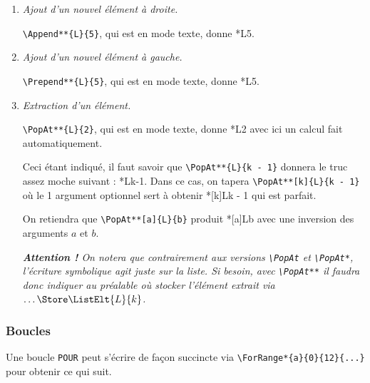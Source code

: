 \begin{enumerate}
	\item \textit{Ajout d'un nouvel élément à droite.}

	      \verb+\Append**{L}{5}+, qui est en mode texte, donne \Append**{L}{5}.


	\item \textit{Ajout d'un nouvel élément à gauche.}

	      \verb+\Prepend**{L}{5}+, qui est en mode texte, donne \Prepend**{L}{5}.


	\item \textit{Extraction d'un élément.}

	      \verb+\PopAt**{L}{2}+, qui est en mode texte, donne \PopAt**{L}{2} avec ici un calcul fait automatiquement.

	      Ceci étant indiqué, il faut savoir que \verb+\PopAt**{L}{k - 1}+ donnera le truc assez moche suivant : \PopAt**{L}{k-1}.
	      Dans ce cas, on tapera \verb+\PopAt**[k]{L}{k - 1}+ où le 1\ier{} argument optionnel sert à obtenir \PopAt**[k]{L}{k - 1} qui est parfait.

	      On retiendra que \verb+\PopAt**[a]{L}{b}+ produit \PopAt**[a]{L}{b} avec une inversion des arguments $a$ et $b$.

	      \smallskip

	      \emph{\textbf{Attention !} On notera que contrairement aux versions \emph{\texttt{\textbackslash{}PopAt}} et \emph{\texttt{\textbackslash{}PopAt*}}, l'écriture symbolique agit juste sur la liste. Si besoin, avec \emph{\texttt{\textbackslash{}PopAt**}} il faudra donc indiquer au préalable où stocker l'élément extrait via $\dots \Store \ListElt{L}{k}$.}
\end{enumerate}




\subsubsection{Boucles}

Une boucle \verb+POUR+ peut s'écrire de façon succincte via \verb+\ForRange*{a}{0}{12}{...}+ pour obtenir ce qui suit.

\begin{algo}[.55]
\end{algo}


